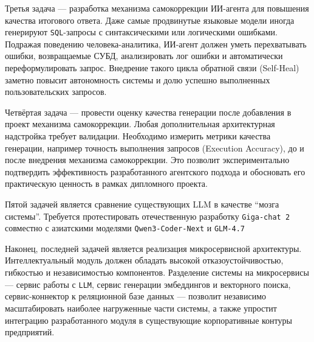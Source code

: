 Третья задача — разработка механизма самокоррекции ИИ-агента для повышения качества итогового ответа. Даже самые продвинутые языковые модели иногда генерируют \texttt{SQL}-запросы с синтаксическими или логическими ошибками. Подражая поведению человека-аналитика, ИИ-агент должен уметь перехватывать ошибки, возвращаемые СУБД, анализировать лог ошибки и автоматически переформулировать запрос. Внедрение такого цикла обратной связи (Self-Heal) заметно повысит автономность системы и долю успешно выполненных пользовательских запросов.

Четвёртая задача — провести оценку качества генерации после добавления в проект механизма самокоррекции. Любая дополнительная архитектурная надстройка требует валидации. Необходимо измерить метрики качества генерации, например точность выполнения запросов (Execution Accuracy), до и после внедрения механизма самокоррекции. Это позволит экспериментально подтвердить эффективность разработанного агентского подхода и обосновать его практическую ценность в рамках дипломного проекта.

Пятой задачей является сравнение существующих LLM в качестве \enquote{мозга системы}. Требуется протестировать отечественную разработку \texttt{Giga-chat 2} совместно с азиатскими моделями \texttt{Qwen3-Coder-Next} и \texttt{GLM-4.7}

Наконец, последней задачей является реализация микросервисной архитектуры. Интеллектуальный модуль должен обладать высокой отказоустойчивостью, гибкостью и независимостью компонентов. Разделение системы на микросервисы — сервис работы с \texttt{LLM}, сервис генерации эмбеддингов и векторного поиска, сервис-коннектор к реляционной базе данных — позволит независимо масштабировать наиболее нагруженные части системы, а также упростит интеграцию разработанного модуля в существующие корпоративные контуры предприятий.